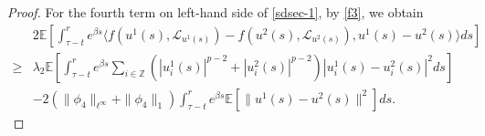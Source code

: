 \documentclass[11pt]{article}
\numberwithin{equation}{section}
\theoremstyle{plain}
\begin{document}
\begin{proof}
 For the fourth term on left-hand side of \eqref{sdsec-1},
 by \eqref{f3}, we obtain
 \begin{align}\label{sdsec-2}
       & 2 \mathbb{E}
             \left[ \int_{\tau-t}^{r} e^{\beta s}
                        \langle f(u^1(s), \mathcal{L}_{u^1(s)}) - f(u^2(s), \mathcal{L}_{u^2(s)}),
                                u^1(s) - u^2(s)
                        \rangle ds
             \right]  \nonumber\\
  \ge & \lambda_2 \mathbb{E}
             \left[ \int_{\tau-t}^{r} e^{\beta s} 
                          \sum_{ i \in \mathbb{Z}} 
             	                                    \left( |u_{i}^1(s)|^{p-2} + |u_{i}^2(s)|^{p-2} \right)    
             	                                    |u_{i} ^1(s) - u_{i}^2(s)|^2 ds
             \right]  \nonumber\\
         & - 2 \left( \|\phi_{4}\|_{\ell^\infty} + \|\phi_{4}\|_1 \right)
             \int_{\tau-t}^{r} e^{\beta s} \mathbb{E} \left[ \|u^1(s) - u^2(s) \|^2 \right] ds.
\end{align}


\end{proof}
\end{document}

